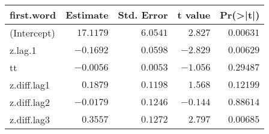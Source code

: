 \begin{table}[!tbp]
{\centering
\begin{tabular}{lrrrr}
\toprule
\multicolumn{1}{l}{first.word}&\multicolumn{1}{c}{Estimate}&\multicolumn{1}{c}{Std. Error}&\multicolumn{1}{c}{t value}&\multicolumn{1}{c}{Pr(\textgreater |t|)}\tabularnewline
\midrule
(Intercept)&$17.1179$&$6.0541$&$ 2.827$&$0.00631$\tabularnewline
z.lag.1&$-0.1692$&$0.0598$&$-2.829$&$0.00629$\tabularnewline
tt&$-0.0056$&$0.0053$&$-1.056$&$0.29487$\tabularnewline
z.diff.lag1&$ 0.1879$&$0.1198$&$ 1.568$&$0.12199$\tabularnewline
z.diff.lag2&$-0.0179$&$0.1246$&$-0.144$&$0.88614$\tabularnewline
z.diff.lag3&$ 0.3557$&$0.1272$&$ 2.797$&$0.00685$\tabularnewline
\bottomrule
\end{tabular}}

\end{table}
